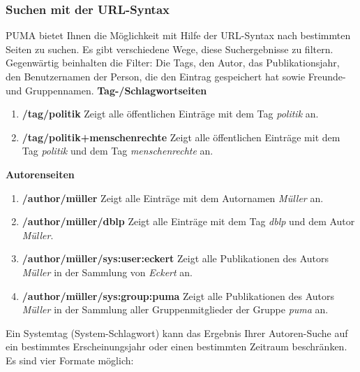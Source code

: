 \subsubsection{Suchen mit der URL-Syntax}
PUMA bietet Ihnen die Möglichkeit mit Hilfe der URL-Syntax nach bestimmten Seiten zu suchen. Es gibt verschiedene Wege, diese Suchergebnisse zu filtern. Gegenwärtig beinhalten die Filter: Die Tags, den Autor, das Publikationsjahr, den Benutzernamen der Person, die den Eintrag gespeichert hat sowie Freunde- und Gruppennamen. \newline
\newline
\textbf{Tag-/Schlagwortseiten}
\begin{enumerate}
    \item \textbf{/tag/politik} \newline
    Zeigt alle öffentlichen Einträge mit dem Tag \textit{politik} an.
    \item \textbf{/tag/politik+menschenrechte}\newline
    Zeigt alle öffentlichen Einträge mit dem Tag \textit{politik} und dem Tag \textit{menschenrechte} an.
\end{enumerate}
\textbf{Autorenseiten}
\begin{enumerate}
    \item \textbf{/author/müller} \newline
    Zeigt alle Einträge mit dem Autornamen \textit{Müller} an.
    \item \textbf{/author/müller/dblp} \newline
    Zeigt alle Einträge mit dem Tag \textit{dblp} und dem Autor \textit{Müller}.
    \item \textbf{/author/müller/sys:user:eckert}\newline
    Zeigt alle Publikationen des Autors \textit{Müller} in der Sammlung von \textit{Eckert} an.
    \item \textbf{/author/müller/sys:group:puma} \newline
    Zeigt alle Publikationen des Autors \textit{Müller} in der Sammlung aller Gruppenmitglieder der Gruppe \textit{puma} an. 
\end{enumerate}
Ein Systemtag (System-Schlagwort) kann das Ergebnis Ihrer Autoren-Suche auf ein bestimmtes Erscheinungsjahr oder einen bestimmten Zeitraum beschränken. Es sind vier Formate möglich:%
